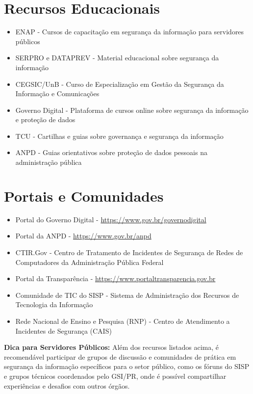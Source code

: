 \documentclass[12pt,a4paper]{report}
\begin{document}
\section{Recursos Educacionais}

\begin{itemize}
  \item ENAP - Cursos de capacitação em segurança da informação para servidores públicos
  \item SERPRO e DATAPREV - Material educacional sobre segurança da informação
  \item CEGSIC/UnB - Curso de Especialização em Gestão da Segurança da Informação e Comunicações
  \item Governo Digital - Plataforma de cursos online sobre segurança da informação e proteção de dados
  \item TCU - Cartilhas e guias sobre governança e segurança da informação
  \item ANPD - Guias orientativos sobre proteção de dados pessoais na administração pública
\end{itemize}

\section{Portais e Comunidades}

\begin{itemize}
  \item Portal do Governo Digital - \url{https://www.gov.br/governodigital}
  \item Portal da ANPD - \url{https://www.gov.br/anpd}
  \item CTIR.Gov - Centro de Tratamento de Incidentes de Segurança de Redes de Computadores da Administração Pública Federal
  \item Portal da Transparência - \url{https://www.portaltransparencia.gov.br}
  \item Comunidade de TIC do SISP - Sistema de Administração dos Recursos de Tecnologia da Informação
  \item Rede Nacional de Ensino e Pesquisa (RNP) - Centro de Atendimento a Incidentes de Segurança (CAIS)
\end{itemize}

\begin{notebox}
\textbf{Dica para Servidores Públicos:} Além dos recursos listados acima, é recomendável participar de grupos de discussão e comunidades de prática em segurança da informação específicos para o setor público, como os fóruns do SISP e grupos técnicos coordenados pelo GSI/PR, onde é possível compartilhar experiências e desafios com outros órgãos.
\end{notebox}
\end{document}
